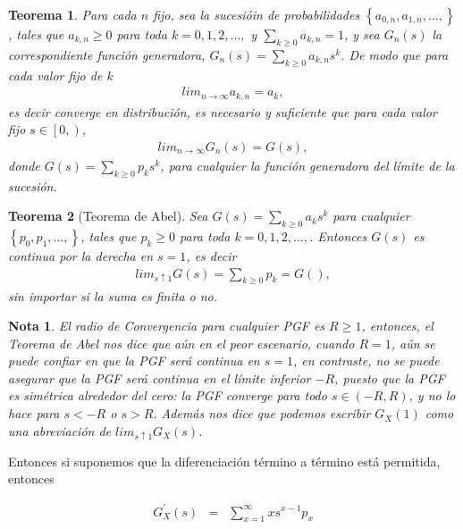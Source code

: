 \documentclass{article}
\newtheorem{Teo}{Teorema}[section]
\newtheorem{Note}{Nota}[section]
\numberwithin{equation}{section}
\begin{document}
{\begin{Teo}
Para cada $n$ fijo, sea la sucesi\'oin de probabilidades $\left\{a_{0,n},a_{1,n},\ldots,\right\}$, tales que $a_{k,n}\geq0$ para toda $k=0,1,2,\ldots,$ y $\sum_{k\geq0}a_{k,n}=1$, y sea $G_{n}\left(s\right)$ la correspondiente funci\'on generadora, $G_{n}\left(s\right)=\sum_{k\geq0}a_{k,n}s^{k}$. De modo que para cada valor fijo de $k$
\begin{eqnarray*}
lim_{n\rightarrow\infty}a_{k,n}=a_{k},
\end{eqnarray*}
es decir converge en distribuci\'on, es necesario y suficiente que para cada valor fijo $s\in\left[0,\right)$,
\begin{eqnarray*}
lim_{n\rightarrow\infty}G_{n}\left(s\right)=G\left(s\right),
\end{eqnarray*}
donde $G\left(s\right)=\sum_{k\geq0}p_{k}s^{k}$, para cualquier la funci\'on generadora del l\'imite de la sucesi\'on.
\end{Teo}

\begin{Teo}[Teorema de Abel]
Sea $G\left(s\right)=\sum_{k\geq0}a_{k}s^{k}$ para cualquier $\left\{p_{0},p_{1},\ldots,\right\}$, tales que $p_{k}\geq0$ para toda $k=0,1,2,\ldots,$. Entonces $G\left(s\right)$ es continua por la derecha en $s=1$, es decir
\begin{eqnarray*}
lim_{s\uparrow1}G\left(s\right)=\sum_{k\geq0}p_{k}=G\left(\right),
\end{eqnarray*}
sin importar si la suma es finita o no.
\end{Teo}
\begin{Note}
El radio de Convergencia para cualquier PGF es $R\geq1$, entonces, el Teorema de Abel nos dice que a\'un en el peor escenario, cuando $R=1$, a\'un se puede confiar en que la PGF ser\'a continua en $s=1$, en contraste, no se puede asegurar que la PGF ser\'a continua en el l\'imite inferior $-R$, puesto que la PGF es sim\'etrica alrededor del cero: la PGF converge para todo $s\in\left(-R,R\right)$, y no lo hace para $s<-R$ o $s>R$. Adem\'as nos dice que podemos escribir $G_{X}\left(1\right)$ como una abreviaci\'on de $lim_{s\uparrow1}G_{X}\left(s\right)$.
\end{Note}

Entonces si suponemos que la diferenciaci\'on t\'ermino a t\'ermino est\'a permitida, entonces

\begin{eqnarray*}
G_{X}^{'}\left(s\right)&=&\sum_{x=1}^{\infty}xs^{x-1}p_{x}
\end{eqnarray*}

}
\end{document}
